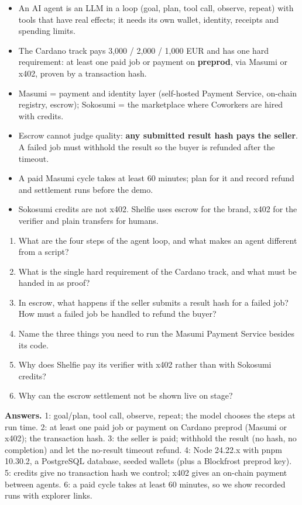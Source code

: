 \begin{keypoints}
\begin{itemize}[nosep]
\item An AI agent is an LLM in a loop (goal, plan, tool call, observe, repeat) with tools that have real effects; it needs its own wallet, identity, receipts and spending limits.
\item The Cardano track pays 3,000 / 2,000 / 1,000 EUR and has one hard requirement: at least one paid job or payment on \textbf{preprod}, via Masumi or x402, proven by a transaction hash.
\item Masumi = payment and identity layer (self-hosted Payment Service, on-chain registry, escrow); Sokosumi = the marketplace where Coworkers are hired with credits.
\item Escrow cannot judge quality: \textbf{any submitted result hash pays the seller}. A failed job must withhold the result so the buyer is refunded after the timeout.
\item A paid Masumi cycle takes at least 60 minutes; plan for it and record refund and settlement runs before the demo.
\item Sokosumi credits are not x402. Shelfie uses escrow for the brand, x402 for the verifier and plain transfers for humans.
\end{itemize}
\end{keypoints}

\begin{quizbox}
\begin{enumerate}[nosep]
  \item What are the four steps of the agent loop, and what makes an agent different from a script?
  \item What is the single hard requirement of the Cardano track, and what must be handed in as proof?
  \item In escrow, what happens if the seller submits a result hash for a failed job? How must a failed job be handled to refund the buyer?
  \item Name the three things you need to run the Masumi Payment Service besides its code.
  \item Why does Shelfie pay its verifier with x402 rather than with Sokosumi credits?
  \item Why can the escrow settlement not be shown live on stage?
\end{enumerate}
\medskip
{\footnotesize\color{cGrey}\textbf{Answers.} 1: goal/plan, tool call, observe, repeat; the model chooses the steps at run time. 2: at least one paid job or payment on Cardano preprod (Masumi or x402); the transaction hash. 3: the seller is paid; withhold the result (no hash, no completion) and let the no-result timeout refund. 4: Node 24.22.x with pnpm 10.30.2, a PostgreSQL database, seeded wallets (plus a Blockfrost preprod key). 5: credits give no transaction hash we control; x402 gives an on-chain payment between agents. 6: a paid cycle takes at least 60 minutes, so we show recorded runs with explorer links.}
\end{quizbox}
